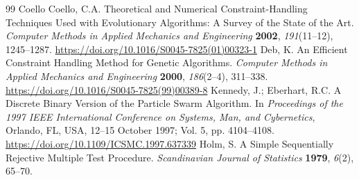 \documentclass[energies,article,submit,moreauthors]{Definitions/mdpi}
\begin{document}
\begin{thebibliography}{99}
 Coello Coello, C.A. Theoretical and Numerical Constraint-Handling Techniques Used with Evolutionary Algorithms: A Survey of the State of the Art. \emph{Computer Methods in Applied Mechanics and Engineering} \textbf{2002}, \emph{191}(11--12), 1245--1287. \url{https://doi.org/10.1016/S0045-7825(01)00323-1}
 Deb, K. An Efficient Constraint Handling Method for Genetic Algorithms. \emph{Computer Methods in Applied Mechanics and Engineering} \textbf{2000}, \emph{186}(2--4), 311--338. \url{https://doi.org/10.1016/S0045-7825(99)00389-8}
 Kennedy, J.; Eberhart, R.C. A Discrete Binary Version of the Particle Swarm Algorithm. In \emph{Proceedings of the 1997 IEEE International Conference on Systems, Man, and Cybernetics}, Orlando, FL, USA, 12--15 October 1997; Vol. 5, pp. 4104--4108. \url{https://doi.org/10.1109/ICSMC.1997.637339}
 Holm, S. A Simple Sequentially Rejective Multiple Test Procedure. \emph{Scandinavian Journal of Statistics} \textbf{1979}, \emph{6}(2), 65--70.
\end{thebibliography}
\end{document}
